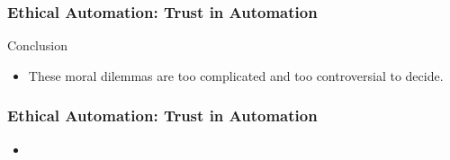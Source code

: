 \begin{frame}
  \frametitle{ Ethical Automation: Trust in Automation}
  {\Large Conclusion}
  \begin{itemize}
  \item These moral dilemmas are too complicated and too controversial to decide.
  \end{itemize}
\end{frame}


\begin{frame}
  \frametitle{ Ethical Automation: Trust in Automation}
  \begin{itemize}
  \item
  \end{itemize}
\end{frame}
